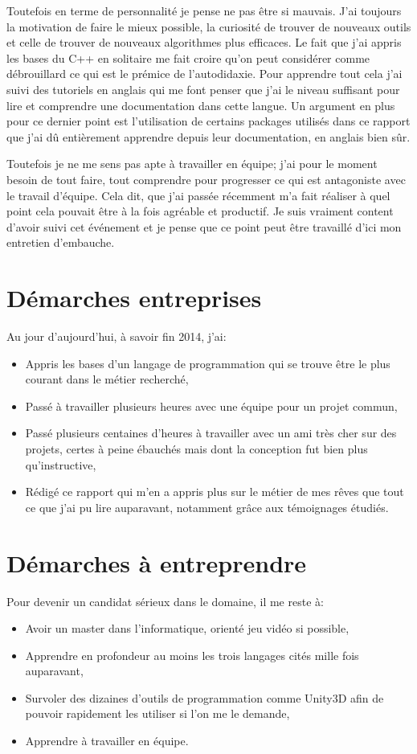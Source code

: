 \documentclass[12pt, a4paper]{report} %
\begin{document}
Toutefois en terme de personnalité je pense ne pas être si mauvais. J'ai toujours la motivation de faire le mieux possible, la curiosité de trouver de nouveaux outils et celle de trouver de nouveaux algorithmes plus efficaces. Le fait que j'ai appris les bases du C++ en solitaire me fait croire qu'on peut considérer comme débrouillard ce qui est le prémice de l'autodidaxie. Pour apprendre tout cela j'ai suivi des tutoriels en anglais qui me font penser que j'ai le niveau suffisant pour lire et comprendre une documentation dans cette langue. Un argument en plus pour ce dernier point est l'utilisation de certains packages utilisés dans ce rapport que j'ai dû entièrement apprendre depuis leur documentation, en anglais bien sûr.

Toutefois je ne me sens pas apte à travailler en équipe; j'ai pour le moment besoin de tout faire, tout comprendre pour progresser ce qui est antagoniste avec le travail d'équipe. Cela dit, \lni{} que j'ai passée récemment m'a fait réaliser à quel point cela pouvait être à la fois agréable et productif. Je suis vraiment content d'avoir suivi cet événement et je pense que ce point peut être travaillé d'ici mon entretien d'embauche.

\section{Démarches entreprises}
Au jour d'aujourd'hui, à savoir fin 2014, j'ai:
\begin{itemize}
\item
  Appris les bases d'un langage de programmation qui se trouve être le plus courant dans le métier recherché,
\item
  Passé \lni{} à travailler plusieurs heures avec une équipe pour un projet commun,
\item
  Passé plusieurs centaines d'heures à travailler avec un ami très cher sur des projets, certes à peine ébauchés mais dont la conception fut bien plus qu'instructive,
\item 
  Rédigé ce rapport qui m'en a appris plus sur le métier de mes rêves que tout ce que j'ai pu lire auparavant, notamment grâce aux témoignages étudiés.
\end{itemize}
\section{Démarches à entreprendre}
Pour devenir un candidat sérieux dans le domaine, il me reste à:
\begin{itemize}
\item
  Avoir un master dans l'informatique, orienté jeu vidéo si possible,
\item
  Apprendre en profondeur au moins les trois langages cités mille fois auparavant,
\item
  Survoler des dizaines d'outils de programmation comme Unity3D afin de pouvoir rapidement les utiliser si l'on me le demande,
\item
  Apprendre à travailler en équipe.
\end{itemize}
\end{document}

